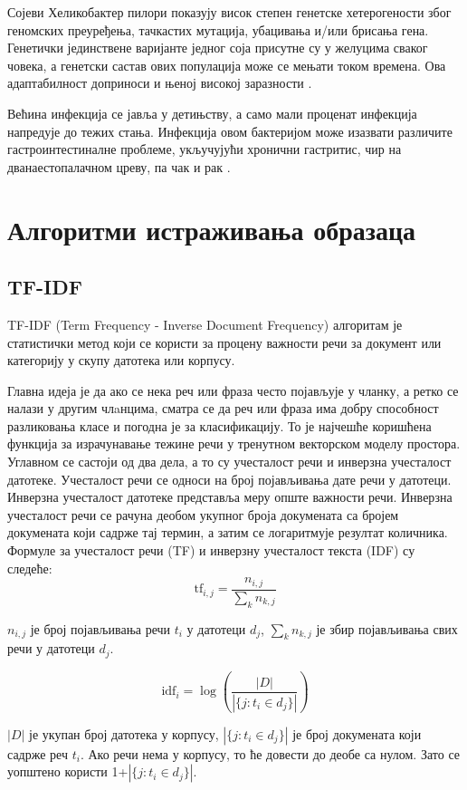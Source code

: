 \documentclass[12pt]{article}
\begin{document}
Сојеви Хеликобактер пилори показују висок степен генетске хетерогености због геномских преуређења, тачкастих мутација, убацивања и/или брисања гена. Генетички јединствене варијанте једног соја присутне су у желуцима сваког човека, а генетски састав ових популација може се мењати током времена. Ова адаптабилност доприноси и њеној високој заразности \cite{Noto2012-rr}.

Већина инфекција се јавља у детињству, а само мали проценат инфекција напредује до тежих стања. Инфекција овом бактеријом може изазвати различите гастроинтестиналне проблеме, укључујући хронични гастритис, чир на дванаестопалачном цреву, па чак и рак \cite{2022helicobacter}.

\section{Алгоритми истраживања образаца}

\subsection{TF-IDF}

TF-IDF \cite{Liu2018-oa} (Term Frequency - Inverse Document Frequency) алгоритам
 је
статистички метод који се користи за процену важности речи
за документ или категорију у скупу датотека или корпусу. 

Главна идеја је да ако се нека реч или фраза често појављује у
чланку, а ретко се налази у другим члaнцима, сматра се
да реч или фраза има добру способност разликовања класе
и погодна је за класификацију. То је најчешће коришћена
функција за израчунавање тежине речи у тренутном
векторском моделу простора. Углавном се састоји од
два дела, а то су учесталост речи и инверзна учесталост
датотеке. Учесталост речи се односи на број појављивања
дате речи у датотеци. Инверзна учесталост датотеке представља
меру опште важности речи. Инверзна учесталост речи се рачуна деобом
укупног броја докумената са бројем
докумената који садрже тај термин, а затим се логаритмује
резултат количника. Формуле за учесталост речи (TF) и
инверзну учесталост текста (IDF) су следеће:
$$\mathrm{tf}_{i,j} = \frac{n_{i,j}}{\sum_{k} n_{k,j}}$$

$n_{i,j}$  је број појављивања речи $t_{i}$ у датотеци $d_{j}$,
$\sum_{k} n_{k,j}$ је збир појављивања свих речи у датотеци
$d_{j}$.

$$\mathrm{idf}_i = \log \left(\frac{|D|}{|\{j : t_i \in d_j\}|}\right) $$

$|D|$ је укупан број датотека у корпусу, $|\{j : t_i \in d_j\}|$
је број докумената који садрже реч $t_{i}$. Ако
речи нема у корпусу, то ће довести до деобе са нулом. Зато се
уопштено користи 1+$|\{j : t_i \in d_j\}|$.
\end{document}
